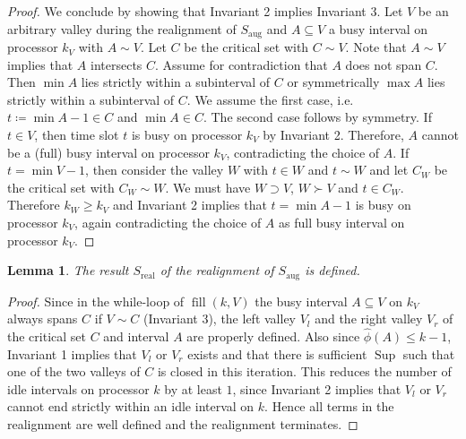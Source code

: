 \documentclass[a4paper]{article}
\DeclareMathOperator{\aug}{aug}
\DeclareMathOperator{\real}{real}
\DeclareMathOperator{\fillop}{fill}
\DeclareMathOperator{\res}{Sup}
\newtheorem{lemma}[theorem]{Lemma}
\begin{document}
\begin{proof}
  We conclude by showing that Invariant 2 implies Invariant 3.
  Let $V$ be an arbitrary valley during the realignment of $S_{\aug}$ and $A \subseteq V$ a busy interval on processor $k_V$ with $A \sim V$.
  Let $C$ be the critical set with $C \sim V$.
  Note that $A \sim V$ implies that $A$ intersects $C$.
  Assume for contradiction that $A$ does not span $C$.
  Then $\min A$ lies strictly within a subinterval of $C$ or symmetrically $\max A$ lies strictly within a subinterval of $C$.
  We assume the first case, i.e.\ $t\coloneqq \min A - 1 \in C$ and $\min A \in C$.
  The second case follows by symmetry.
  If $t \in V$, then time slot $t$ is busy on processor $k_V$ by Invariant 2.
  Therefore, $A$ cannot be a (full) busy interval on processor $k_V$, contradicting the choice of $A$.
  If $t = \min V-1$, then consider the valley $W$ with $t \in W$ and $t \sim W$ and let $C_W$ be the critical set with $C_W \sim W$.
  We must have $W \supset V$, $W \succ V$ and $t \in C_W$.
  Therefore $k_W \geq k_V$ and Invariant 2 implies that $t = \min A - 1$ is busy on processor $k_V$, again contradicting the choice of $A$ as full busy interval on processor $k_V$.
\end{proof}

\begin{lemma}\label{lemma:s_real}
  The result $S_{\real}$ of the realignment of $S_{\aug}$ is defined.
\end{lemma}
\begin{proof}

  Since in the while-loop of $\fillop(k, V)$ the busy interval $A \subseteq V$ on $k_V$ always spans $C$ if $V \sim C$ (Invariant 3), the left valley $V_l$ and the right valley $V_r$ of the critical set $C$ and interval $A$ are properly defined.
  Also since $\hat \phi(A) \leq k - 1$, Invariant 1 implies that $V_l$ or $V_r$ exists and that there is sufficient $\res$ such that one of the two valleys of $C$ is closed in this iteration.
  This reduces the number of idle intervals on processor $k$ by at least $1$, since Invariant 2 implies that $V_l$ or $V_r$ cannot end strictly within an idle interval on $k$.
  Hence all terms in the realignment are well defined and the realignment terminates.
\end{proof}
\end{document}
